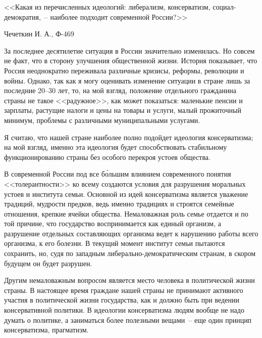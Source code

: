 \documentclass[pscyr]{hedreport}
\begin{document}
  \onehalfspacing
  \begin{center}
    <<Какая из перечисленных идеологий: либерализм, консерватизм,
      социал-демократия,~-- наиболее подходит современной России?>>
  \end{center}  
  \vspace{-2em}
  \begin{flushright}
    Чечеткин И. А., Ф-469
  \end{flushright}

  За последнее десятилетие ситуация в России значительно изменилась. Но совсем
  не факт, что в сторону улучшения общественной жизни. История показывает, что
  Россия неоднократно переживала различные кризисы, реформы, революции и войны.
  Однако, так как я могу оценивать изменение ситуации в стране лишь за последние
  20--30 лет, то, на мой взгляд, положение отдельного гражданина страны не такое
  <<радужное>>, как может показаться: маленькие пенсии и зарплаты, растущие
  налоги и цены на товары и услуги, малый прожиточный минимум, проблемы с
  различными муниципальными услугами.

  Я считаю, что нашей стране наиболее полно подойдет идеология консерватизма; на
  мой взгляд, именно эта идеология будет способствовать стабильному
  функционированию страны без особого перекроя устоев общества.

  В современной России под все б\'{о}льшим влиянием современного понятия
  <<толерантности>> ко всему создаются условия для разрушения моральных устоев и
  института семьи. Основной из идей консерватизма является уважение традиций,
  мудрости предков, ведь именно традициях и строятся семейные отношения, крепкие
  ячейки общества. Немаловажная роль семье отдается и по той причине, что
  государство воспринимается как единый организм, а разрушение отдельных
  составляющих организма ведет к нарушению работы всего организма, к его
  болезни. В текущий момент институт семьи пытаются сохранить, но, судя по
  западным либерально-демократическим странам, в скором будущем он будет
  разрушен.

  Другим немаловажным вопросом является место человека в политической жизни
  страны. В настоящее время граждане нашей страны не принимают активного участия
  в политической жизни государства, как и должно быть при ведении консервативной
  политики. В идеологии консерватизма людям вообще не надо думать о политике, а
  заниматься более полезными вещами~-- еще один принцип консерватизма,
  прагматизм.
\end{document}
